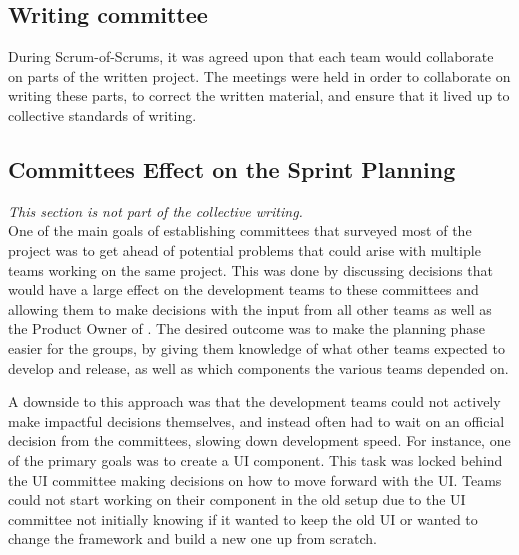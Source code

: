 \subsection{Writing committee}
During Scrum-of-Scrums, it was agreed upon that each team would collaborate on parts of the written project. The meetings were held in order to collaborate on writing these parts, to correct the written material, and ensure that it lived up to collective standards of writing.



\subsection{Committees Effect on the Sprint Planning}
\textit{This section is not part of the collective writing.}\\
One of the main goals of establishing committees that surveyed most of the \knox{} project was to get ahead of potential problems that could arise with multiple teams working on the same project. 
This was done by discussing decisions that would have a large effect on the development teams to these committees and allowing them to make decisions with the input from all other  \knox{} teams as well as the Product Owner of \knox{}. 
The desired outcome was to make the planning phase easier for the groups, by giving them knowledge of what other teams expected to develop and release, as well as which components the various teams depended on.

A downside to this approach was that the development teams could not actively make impactful decisions themselves, and instead often had to wait on an official decision from the committees, slowing down development speed. 
For instance, one of the primary goals was to create a UI component. 
This task was locked behind the UI committee making decisions on how to move forward with the UI. 
Teams could not start working on their component in the old setup due to the UI committee not initially knowing if it wanted to keep the old UI or wanted to change the framework and build a new one up from scratch.
